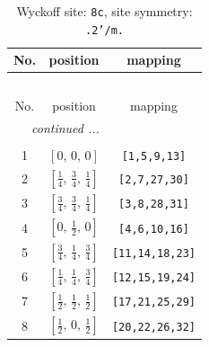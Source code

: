 \documentclass[fleqn,8pt]{jsarticle}
\begin{document}
\renewcommand{\arraystretch}{1.2}
\begin{longtable}{ccc}
\caption{Wyckoff site: {\tt 8c}, site symmetry: {\tt .2'/m.}}
 \\
 \hline \hline
No. & position & mapping \\ \hline \endfirsthead

\multicolumn{2}{l}{\tablename\ \thetable{}} \\
 \hline \hline
No. & position & mapping \\ \hline \endhead

 \hline \hline
\multicolumn{2}{r}{\footnotesize\it continued ...} \\ \endfoot

 \hline \hline
\multicolumn{2}{r}{} \\ \endlastfoot

1 & $\left[ 0,\, 0,\, 0 \right]$ & {\tt [1,5,9,13]} \\ \hline
2 & $\left[ \frac{1}{4},\, \frac{3}{4},\, \frac{1}{4} \right]$ & {\tt [2,7,27,30]} \\ \hline
3 & $\left[ \frac{3}{4},\, \frac{3}{4},\, \frac{1}{4} \right]$ & {\tt [3,8,28,31]} \\ \hline
4 & $\left[ 0,\, \frac{1}{2},\, 0 \right]$ & {\tt [4,6,10,16]} \\ \hline
5 & $\left[ \frac{3}{4},\, \frac{1}{4},\, \frac{3}{4} \right]$ & {\tt [11,14,18,23]} \\ \hline
6 & $\left[ \frac{1}{4},\, \frac{1}{4},\, \frac{3}{4} \right]$ & {\tt [12,15,19,24]} \\ \hline
7 & $\left[ \frac{1}{2},\, \frac{1}{2},\, \frac{1}{2} \right]$ & {\tt [17,21,25,29]} \\ \hline
8 & $\left[ \frac{1}{2},\, 0,\, \frac{1}{2} \right]$ & {\tt [20,22,26,32]} \\
\end{longtable}
\renewcommand{\arraystretch}{1.2}
\end{document}
